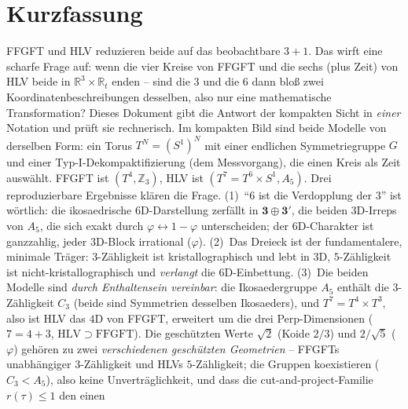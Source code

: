 
\section*{Kurzfassung}
FFGFT und HLV reduzieren beide auf das beobachtbare $3{+}1$. Das wirft eine scharfe Frage
auf: wenn die vier Kreise von FFGFT und die sechs (plus Zeit) von HLV beide in
$\mathbb{R}^3\times\mathbb{R}_t$ enden -- sind die $3$ und die $6$ dann bloß zwei
Koordinatenbeschreibungen desselben, also nur eine mathematische Transformation? Dieses
Dokument gibt die Antwort der kompakten Sicht in \emph{einer} Notation und prüft sie
rechnerisch. Im kompakten Bild sind beide Modelle von derselben Form: ein Torus
$T^N=(S^1)^N$ mit einer endlichen Symmetriegruppe $G$ und einer Typ-I-Dekompaktifizierung
(dem Messvorgang), die einen Kreis als Zeit auswählt. FFGFT ist $(T^4,\mathbb{Z}_3)$, HLV
ist $(T^7=T^6\times S^1, A_5)$. Drei reproduzierbare Ergebnisse klären die Frage.
(1)~``$6$ ist die Verdopplung der $3$'' ist wörtlich: die ikosaedrische $6$D-Darstellung
zerfällt in $\mathbf{3}\oplus\mathbf{3'}$, die beiden $3$D-Irreps von $A_5$, die sich exakt
durch $\varphi\leftrightarrow 1-\varphi$ unterscheiden; der $6$D-Charakter ist ganzzahlig,
jeder $3$D-Block irrational ($\varphi$). (2)~Das Dreieck ist der fundamentalere, minimale
Träger: $3$-Zähligkeit ist kristallographisch und lebt in $3$D, $5$-Zähligkeit ist
nicht-kristallographisch und \emph{verlangt} die $6$D-Einbettung. (3)~Die beiden Modelle
sind \emph{durch Enthaltensein vereinbar}: die Ikosaedergruppe $A_5$ enthält die
$3$-Zähligkeit $C_3$ (beide sind Symmetrien desselben Ikosaeders), und $T^7=T^4\times T^3$,
also ist HLV das $4$D von FFGFT, erweitert um die drei Perp-Dimensionen ($7=4+3$,
$\mathrm{HLV}\supset\mathrm{FFGFT}$). Die geschützten Werte $\sqrt2$ (Koide $2/3$) und
$2/\sqrt5$ ($\varphi$) gehören zu zwei \emph{verschiedenen geschützten Geometrien} -- FFGFTs
unabhängiger $3$-Zähligkeit und HLVs $5$-Zähligkeit; die Gruppen koexistieren ($C_3<A_5$),
also keine Unverträglichkeit, und dass die cut-and-project-Familie $r(\tau)\le1$ den einen

